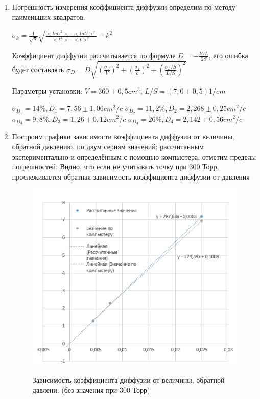 \documentclass{article}
\begin{document}
\begin{enumerate}
\item Погрешность измерения коэффициента диффузии определим по методу наименьших квадратов:
\begin{center}
$\sigma_k = \frac{1}{\sqrt{n}}\sqrt{\frac{<ln U^2>-<ln U>^2}{<t^2>-<t>^2}-k^2}$
\end{center}

Коэффициент диффузии рассчитывается по формуле $D = -\frac{kVL}{2S}$, его ошибка будет составлять $\sigma_D = D\sqrt{(\frac{\sigma_V}{V})^2+(\frac{\sigma_k}{k})^2+(\frac{\sigma_L/S}{L/S})^2}$

Параметры установки: $V = 360 \pm 0,5 cm^3$, $L/S = (7,0 \pm 0,5) 1/cm$

\begin{center}
$\sigma_D_1 = 14\%,    D_1 = 7,56 \pm 1,06 cm^2/c$
$\sigma_D_2 = 11,2\%,     D_2 = 2,268 \pm 0,25 cm^2/c$
$\sigma_D_3 = 9,8\%,     D_3 = 1,26 \pm 0,12 cm^2/c$
$\sigma_D_4 = 26\%,    D_4 = 2,142 \pm 0,56 cm^2/c$
\end{center}

\item Построим графики зависимости коэффициента диффузии от величины, обратной давлению, по двум сериям значений: рассчитанным экспериментально и определённым с помощью компьютера, отметим пределы погрешностей. Видно, что если не учитывать точку при 300 Торр, прослеживается обратная зависимость коэффициента диффузии от давления
\begin{figure}[H]
    \centering
    \begin{center}
    \caption{Зависимость коэффициента диффузии от величины, обратной давлени. (без значения при 300 Торр)}
    \end{center}
    \includegraphics[width=10 cm]{atm.PNG}
    \label{fig:vac}
\end{figure} 


\end{enumerate}
\end{document}

